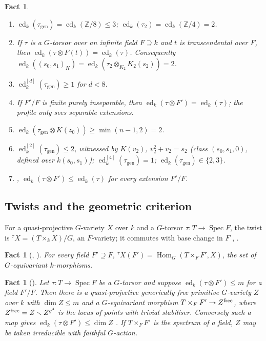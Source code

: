 \documentclass[11pt]{amsart}
\newtheorem{fact}[theorem]{Fact}
\theoremstyle{definition}
\theoremstyle{remark}
\newcommand{\ed}{\operatorname{ed}}
\newcommand{\edd}[1]{\ed^{[#1]}}
\newcommand{\gen}{\mathrm{gen}}
\newcommand{\Z}{\mathbb Z}
\newcommand{\Hom}{\operatorname{Hom}}
\newcommand{\Spec}{\operatorname{Spec}}
\begin{document}
\begin{fact}\label{fact:ed}
\begin{enumerate}[label=\textup{(\alph*)}]
\item \cite[Lemma 2.1]{P} $\ed_k(\tau_{\gen})=\ed_k(\Z/8)\le3$; \cite[Prop.~6.1]{P}
$\ed_k(\tau_2)=\ed_k(\Z/4)=2$.
\item \cite[Lemma 4.1(i)]{P} If $\tau$ is a $G$-torsor over an infinite field
$F\supseteq k$ and $t$ is transcendental over $F$, then $\ed_k(\tau\otimes F(t))=\ed_k(\tau)$.
Consequently $\ed_k((s_0,s_1)_K)=\ed_k(\tau_2\otimes_{K_2}K_2(s_2))=2$.
\item \cite[Prop.~3.2(c)]{P} $\edd d_k(\tau_{\gen})\ge1$ for $d<8$.
\item \cite[Prop.~3.6]{P} If $F'/F$ is finite purely inseparable, then
$\ed_k(\tau\otimes F')=\ed_k(\tau)$; the profile only sees separable extensions.
\item \cite[Prop.~3.9]{P} $\ed_k(\tau_{\gen}\otimes K(z_0))\ge\min(n-1,2)=2$.
\item \cite[Theorem 7.1]{P} $\edd2_k(\tau_{\gen})\le2$, witnessed by $K(v_2)$,
$v_2^2+v_2=s_2$ (class $(s_0,s_1,0)$, defined over $k(s_0,s_1)$); $\edd4_k(\tau_{\gen})=1$;
$\ed_k(\tau_{\gen})\in\{2,3\}$.
\item \cite[\S3.1]{P}, \cite[Lemma 2.1(b)]{BF} $\ed_k(\tau\otimes F')\le\ed_k(\tau)$ for
every extension $F'/F$.
\end{enumerate}
\end{fact}

\subsection{Twists and the geometric criterion}
For a quasi-projective $G$-variety $X$ over $k$ and a $G$-torsor $\tau\colon T\to\Spec F$,
the twist is ${}^\tau X=(T\times_kX)/G$, an $F$-variety; it commutes with base change in
$F$ \cite[\S2.4]{P}, \cite[\S3]{DR}.

\begin{fact}[{\cite[Fact 2.2(a)]{P}, \cite[Lemma 7.3]{DR}}]\label{fact:twistpts}
For every field $F'\supseteq F$, ${}^\tau X(F')=\Hom_G(T\times_FF',X)$, the set of
$G$-equivariant $k$-morphisms.
\end{fact}

\begin{fact}[{\cite[Theorem 4.2, (1)$\Rightarrow$(3) and last paragraph]{P}}]\label{fact:geom}
Let $\tau\colon T\to\Spec F$ be a $G$-torsor and suppose $\ed_k(\tau\otimes F')\le m$ for
a field $F'/F$. Then there is a quasi-projective generically free primitive $G$-variety
$Z$ over $k$ with $\dim Z\le m$ and a $G$-equivariant morphism $T\times_FF'\to Z^{\rm free}$,
where $Z^{\rm free}=Z\smallsetminus Z^{g^4}$ is the locus of points with trivial
stabiliser. Conversely such a map gives $\ed_k(\tau\otimes F')\le\dim Z$ \cite[Lemma 2.3]{P}.
If $T\times_FF'$ is the spectrum of a field, $Z$ may be taken irreducible with faithful
$G$-action.
\end{fact}
\end{document}
